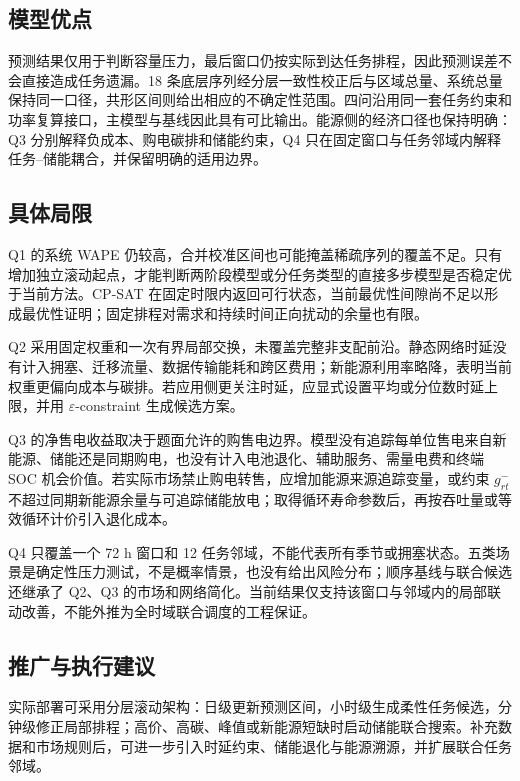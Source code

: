 \subsection{模型优点}

预测结果仅用于判断容量压力，最后窗口仍按实际到达任务排程，因此预测误差不会直接造成任务遗漏。18 条底层序列经分层一致性校正后与区域总量、系统总量保持同一口径，共形区间则给出相应的不确定性范围。四问沿用同一套任务约束和功率复算接口，主模型与基线因此具有可比输出。能源侧的经济口径也保持明确：Q3 分别解释负成本、购电碳排和储能约束，Q4 只在固定窗口与任务邻域内解释任务--储能耦合，并保留明确的适用边界。

\subsection{具体局限}

Q1 的系统 WAPE 仍较高，合并校准区间也可能掩盖稀疏序列的覆盖不足。只有增加独立滚动起点，才能判断两阶段模型或分任务类型的直接多步模型是否稳定优于当前方法。CP-SAT 在固定时限内返回可行状态，当前最优性间隙尚不足以形成最优性证明；固定排程对需求和持续时间正向扰动的余量也有限。

Q2 采用固定权重和一次有界局部交换，未覆盖完整非支配前沿。静态网络时延没有计入拥塞、迁移流量、数据传输能耗和跨区费用；新能源利用率略降，表明当前权重更偏向成本与碳排。若应用侧更关注时延，应显式设置平均或分位数时延上限，并用 $\varepsilon$-constraint 生成候选方案。

Q3 的净售电收益取决于题面允许的购售电边界。模型没有追踪每单位售电来自新能源、储能还是同期购电，也没有计入电池退化、辅助服务、需量电费和终端 SOC 机会价值。若实际市场禁止购电转售，应增加能源来源追踪变量，或约束 $g^-_{rt}$ 不超过同期新能源余量与可追踪储能放电；取得循环寿命参数后，再按吞吐量或等效循环计价引入退化成本。

Q4 只覆盖一个 72 h 窗口和 12 任务邻域，不能代表所有季节或拥塞状态。五类场景是确定性压力测试，不是概率情景，也没有给出风险分布；顺序基线与联合候选还继承了 Q2、Q3 的市场和网络简化。当前结果仅支持该窗口与邻域内的局部联动改善，不能外推为全时域联合调度的工程保证。

\subsection{推广与执行建议}

实际部署可采用分层滚动架构：日级更新预测区间，小时级生成柔性任务候选，分钟级修正局部排程；高价、高碳、峰值或新能源短缺时启动储能联合搜索。补充数据和市场规则后，可进一步引入时延约束、储能退化与能源溯源，并扩展联合任务邻域。
